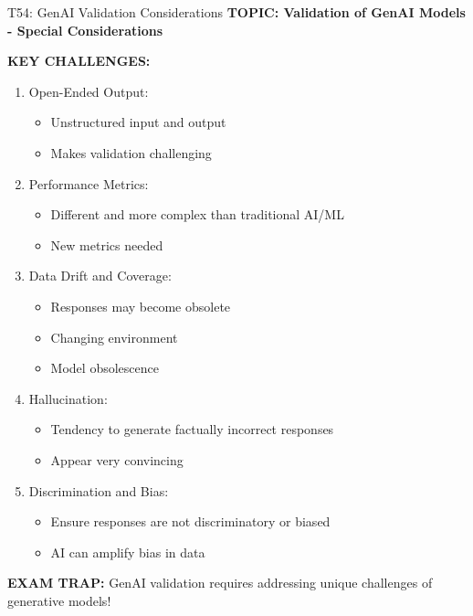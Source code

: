 \documentclass[8pt]{beamer}
\begin{document}
	\begin{frame}{T54: GenAI Validation Considerations}
		\fontsize{6.5}{7.5}\selectfont
		\textbf{TOPIC: Validation of GenAI Models - Special Considerations}
		
		\vspace{0.1cm}
		\textbf{KEY CHALLENGES:}
		\begin{enumerate}
			\item \textcolor{myblue}{Open-Ended Output:}
			\begin{itemize}
				\item Unstructured input and output
				\item Makes validation challenging
			\end{itemize}
			\item \textcolor{myblue}{Performance Metrics:}
			\begin{itemize}
				\item Different and more complex than traditional AI/ML
				\item New metrics needed
			\end{itemize}
			\item \textcolor{myblue}{Data Drift and Coverage:}
			\begin{itemize}
				\item Responses may become obsolete
				\item Changing environment
				\item Model obsolescence
			\end{itemize}
			\item \textcolor{myblue}{Hallucination:}
			\begin{itemize}
				\item Tendency to generate factually incorrect responses
				\item Appear very convincing
			\end{itemize}
			\item \textcolor{myblue}{Discrimination and Bias:}
			\begin{itemize}
				\item Ensure responses are not discriminatory or biased
				\item AI can amplify bias in data
			\end{itemize}
		\end{enumerate}
		
		\textcolor{myred}{\textbf{EXAM TRAP:}} GenAI validation requires \textcolor{myblue}{addressing unique challenges of generative models}!
	\end{frame}
	
\end{document}
